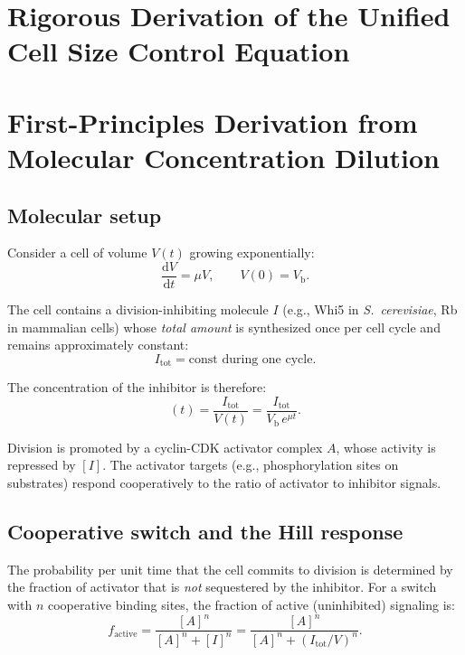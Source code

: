\documentclass[11pt]{article}
\newcommand{\Vb}{V_{\mathrm{b}}}
\newcommand{\dd}{\mathrm{d}}
\begin{document}
\section*{Rigorous Derivation of the Unified Cell Size Control Equation}

\section{First-Principles Derivation from Molecular Concentration Dilution}

\subsection{Molecular setup}

Consider a cell of volume $V(t)$ growing exponentially:
\begin{equation}
  \frac{\dd V}{\dd t} = \mu V, \qquad V(0) = \Vb.
  \label{eq:exp_growth}
\end{equation}

The cell contains a division-inhibiting molecule $I$ (e.g., Whi5 in \textit{S.\ cerevisiae}, Rb in mammalian cells) whose \emph{total amount} is synthesized once per cell cycle and remains approximately constant:
\begin{equation}
  I_{\mathrm{tot}} = \text{const during one cycle}.
\end{equation}

The concentration of the inhibitor is therefore:
\begin{equation}
  [I](t) = \frac{I_{\mathrm{tot}}}{V(t)} = \frac{I_{\mathrm{tot}}}{\Vb\, e^{\mu t}}.
  \label{eq:inhibitor_conc}
\end{equation}

Division is promoted by a cyclin-CDK activator complex $A$, whose activity is repressed by $[I]$. The activator targets (e.g., phosphorylation sites on substrates) respond cooperatively to the ratio of activator to inhibitor signals.

\subsection{Cooperative switch and the Hill response}

The probability per unit time that the cell commits to division is determined by the fraction of activator that is \emph{not} sequestered by the inhibitor. For a switch with $n$ cooperative binding sites, the fraction of active (uninhibited) signaling is:
\begin{equation}
  f_{\mathrm{active}} = \frac{[A]^n}{[A]^n + [I]^n} = \frac{[A]^n}{[A]^n + (I_{\mathrm{tot}}/V)^n}.
  \label{eq:hill_switch}
\end{equation}
\end{document}
